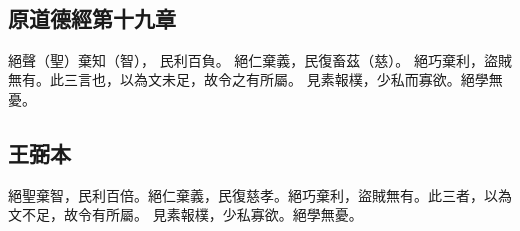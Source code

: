 ﻿%
%

\chapter{~}

\section{原道德經第十九章}

\begin{withgezhu}

\zhsong


絕聲（\textcolor{tongjia-color}{聖}）棄知（\textcolor{tongjia-color}{智}），
民利百負。
絕仁棄義，民復畜茲（\textcolor{tongjia-color}{慈}）。
絕巧棄利，盜賊無有。此三言也，以為文未足，故令之有所屬。
見素報\colorbox{adding-color}{樸，少私而寡欲}。\colorbox{adding-color}{絕學無憂}。

\end{withgezhu}

\section{王弼本}

\begin{withgezhu}

\zhsong

絕聖棄智，民利百倍。絕仁棄義，民復慈孝。絕巧棄利，盜賊無有。此三者，以為文不足，故令有所屬。
見素報樸，少私寡欲。絕學無憂。

\end{withgezhu}
